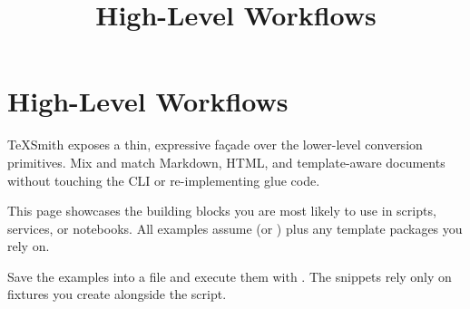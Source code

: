 \documentclass[a4paper,twoside]{article}
\title{High-Level Workflows}
\author{}\date{}
\begin{document}
\maketitle
\section{High-Level Workflows}
TeXSmith exposes a thin, expressive façade over the lower-level conversion primitives. Mix and match Markdown, HTML, and template-aware documents without touching the CLI or re-implementing glue code.

This page showcases the building blocks you are most likely to use in scripts, services, or notebooks. All examples assume  (or ) plus any template packages you rely on.
\begin{tscallout}[kind=tip, title={Run the snippets}]
Save the examples into a file and execute them with . The snippets rely only on fixtures you create alongside the script.
\end{tscallout}
\end{document}
